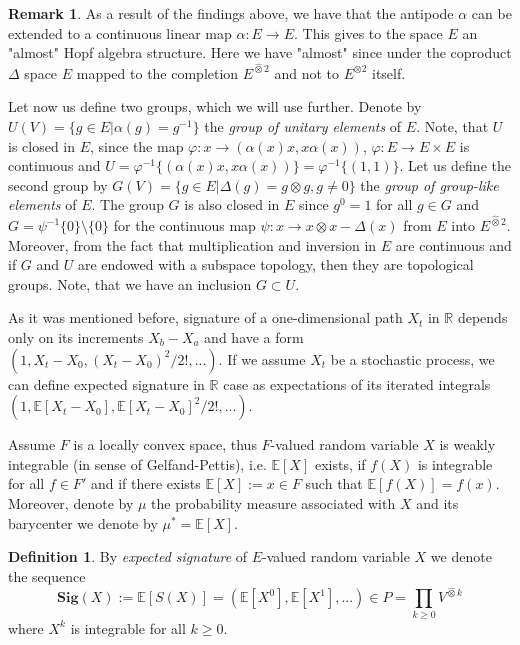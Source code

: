 \documentclass[12pt,a4paper]{report}
\theoremstyle{definition}
\newtheorem{definition}{Definition}
\newtheorem{remark}{Remark}
\begin{document}
\begin{remark}
	As a result of the findings above, we have that the antipode $\alpha$ can be extended to a continuous linear map $\alpha : E\rightarrow E$. This gives to the space $E$ an "almost" Hopf algebra structure. Here we have "almost" since under the coproduct $\Delta$ space $E$ mapped to the completion $E^{\hat{\otimes}2}$ and not to $E^{\otimes2}$ itself.
\end{remark}

Let now us define two groups, which we will use further. Denote by $U(V) = \{g \in E | \alpha(g) = g^{-1}\}$ the \textit{group of unitary elements} of $E$. Note, that $U$ is closed in $E$, since the map $\varphi : x \rightarrow (\alpha(x)x, x\alpha(x))$, $\varphi:E \rightarrow E\times E$ is continuous and $U = \varphi^{-1}\{(\alpha(x)x, x\alpha(x))\} =\varphi^{-1}\{(1, 1)\}$.
Let us define the second group by $G(V ) = \{g \in E | \Delta(g) = g\otimes g, g \neq 0\}$ the \textit{group of group-like elements} of $E$. The group $G$ is also  closed in $E$ since $g^0 = 1$ for all $g \in G$ and $G = \psi^{-1}\{0\} \setminus \{0\}$ for the continuous map $\psi : x \rightarrow x \otimes x -\Delta(x)$ from $E$ into $E^{\hat{\otimes}2}$. Moreover, from the fact that multiplication and inversion in $E$ are continuous \parencite[see][p.5, p.52]{mallios1986topological} and if $G$ and $U$ are endowed with a subspace topology, then they are topological groups. Note, that we have an inclusion $G \subset U$.

As it was mentioned before, signature of a one-dimensional path $X_t$ in $\mathbb{R}$ depends only on its increments $X_b-X_a$ and have a form $(1, X_t-X_0,(X_t-X_0)^2/2!, . . .)$. If we assume $X_t$ be a stochastic process, we can define expected signature in $\mathbb{R}$ case as expectations of its iterated integrals $(1, \mathbb{E}[X_t - X_0] , \mathbb{E} [X_t -X_0]^2/2! , . . .)$.


Assume $F$ is a locally convex space, thus $F$-valued random variable $X$ is weakly integrable (in sense of Gelfand-Pettis), i.e. $\mathbb{E}[X]$ exists, if $f(X)$ is integrable for all $f\in F'$  and if there exists $\mathbb{E}[X]:=x\in F$ such that $\mathbb{E}[f (X)]=f(x)$. Moreover, denote by $\mu$ the probability measure associated with $X$ and its barycenter we denote by $\mu^*=\mathbb{E}[X]$.



\begin{definition}
	By \textit{expected signature} of $E$-valued random variable $X$ we denote the sequence 
	\begin{equation}
		\textbf{Sig}(X):=\mathbb{E}[S(X)]=(\mathbb{E}[X^0],\mathbb{E}[X^1],...)\in P=\prod_{k\geq0}V^{\hat{\otimes}k}
	\end{equation}
where $X^k$ is integrable for all $k\geq0$.
\end{definition}
\end{document}
